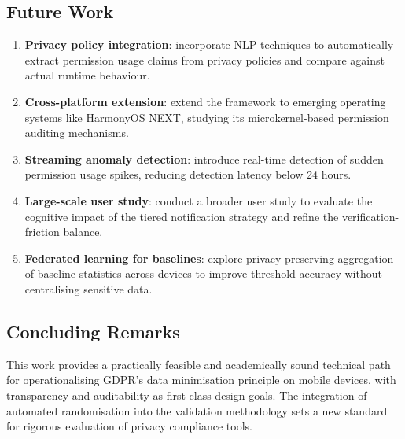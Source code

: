 \subsection{Future Work}
\begin{enumerate}
\item \textbf{Privacy policy integration}: incorporate NLP techniques to automatically extract permission usage claims from privacy policies and compare against actual runtime behaviour.
\item \textbf{Cross-platform extension}: extend the framework to emerging operating systems like HarmonyOS NEXT, studying its microkernel-based permission auditing mechanisms.
\item \textbf{Streaming anomaly detection}: introduce real-time detection of sudden permission usage spikes, reducing detection latency below 24 hours.
\item \textbf{Large-scale user study}: conduct a broader user study to evaluate the cognitive impact of the tiered notification strategy and refine the verification-friction balance.
\item \textbf{Federated learning for baselines}: explore privacy-preserving aggregation of baseline statistics across devices to improve threshold accuracy without centralising sensitive data.
\end{enumerate}

\subsection{Concluding Remarks}
This work provides a practically feasible and academically sound technical path for operationalising GDPR's data minimisation principle on mobile devices, with transparency and auditability as first-class design goals. The integration of automated randomisation into the validation methodology sets a new standard for rigorous evaluation of privacy compliance tools.